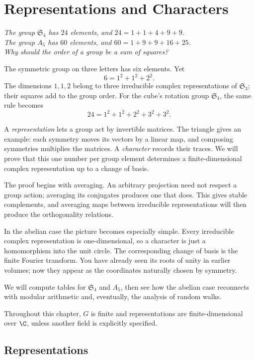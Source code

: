 \chapter{Representations and Characters}

\begin{center}\itshape
The group $\mathfrak S_4$ has $24$ elements, and $24=1+1+4+9+9$.\\
The group $A_5$ has $60$ elements, and $60=1+9+9+16+25$.\\
Why should the order of a group be a sum of squares?
\end{center}

The symmetric group on three letters has six elements. Yet
\[
6=1^2+1^2+2^2.
\]
The dimensions $1,1,2$ belong to three irreducible complex representations of $\mathfrak S_3$; their squares add to the group order. For the cube's rotation group $\mathfrak S_4$, the same rule becomes
\[
24=1^2+1^2+2^2+3^2+3^2.
\]

A \emph{representation} lets a group act by invertible matrices. The triangle gives an example: each symmetry moves its vectors by a linear map, and composing symmetries multiplies the matrices. A \emph{character} records their traces. We will prove that this one number per group element determines a finite-dimensional complex representation up to a change of basis.

The proof begins with averaging. An arbitrary projection need not respect a group action; averaging its conjugates produces one that does. This gives stable complements, and averaging maps between irreducible representations will then produce the orthogonality relations.

In the abelian case the picture becomes especially simple. Every irreducible complex representation is one-dimensional, so a character is just a homomorphism into the unit circle. The corresponding change of basis is the finite Fourier transform. You have already seen its roots of unity in earlier volumes; now they appear as the coordinates naturally chosen by symmetry.

We will compute tables for $\mathfrak S_4$ and $A_5$, then see how the abelian case reconnects with modular arithmetic and, eventually, the analysis of random walks.

Throughout this chapter, $G$ is finite and representations are finite-dimensional
over $\C$, unless another field is explicitly specified.

\section{Representations}

